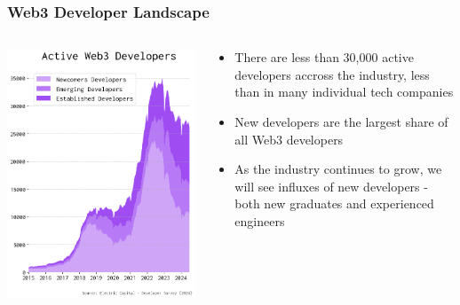 \documentclass[aspectratio=169]{beamer}
\begin{document}
	
\begin{frame}
	\frametitle{Web3 Developer Landscape}
	
	\vspace{2.5em}
	\begin{columns}[T]
		\begin{column}{0.4\textwidth}
			\includegraphics[width=\columnwidth, height=0.8\textheight]{charts/developers.png}
		\end{column}
		
		\begin{column}{0.55\textwidth}
			\begin{itemize}
				\item There are less than 30,000 active developers accross the industry, less than in many individual tech companies
				\vspace{1em}
				\item New developers are the largest share of all Web3 developers
				\vspace{1em}
				\item As the industry continues to grow, we will see influxes of new developers - both new graduates and experienced engineers
			\end{itemize}
		\end{column}
	\end{columns}
	
\end{frame}
	
\end{document}
